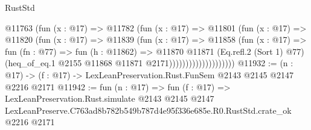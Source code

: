 \begin{lexlean}{RustStd}
\begin{coremodule}
                            @11763
                              (fun (x : @17) =>
                              @11782
                                (fun (x : @17) =>
                                @11801
                                  (fun (x : @17) =>
                                  @11820
                                    (fun (x : @17) =>
                                    @11839
                                      (fun (x : @17) =>
                                      @11858
                                        (fun (x : @17) =>
                                        fun (fn : @77) =>
                                        fun (h : @11862) =>
                                        @11870
                                          @11871
                                          (Eq.refl.{2} (Sort 1) @77)
                                          (heq_of_eq.{1}
                                            @2155
                                            @11868
                                            @11871
                                            @2171))))))))))))))))))))
@11932 := (n : @17) -> (f : @17) -> LexLeanPreservation.Rust.FunSem @2143 @2145 @2147 @2216 @2171
@11942 := fun (n : @17) =>
  fun (f : @17) =>
  LexLeanPreservation.Rust.simulate
    @2143
    @2145
    @2147
    LexLeanPreserve.C763ad8b782b549b787d4e95f336e685e.R0.RustStd.crate_ok
    @2216
    @2171
\end{coremodule}
\end{lexlean}
